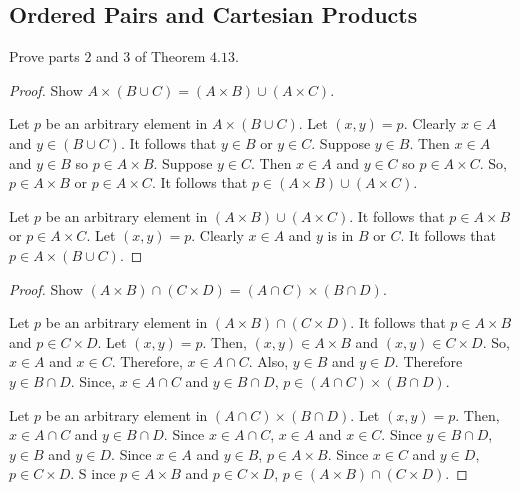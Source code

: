 \subsection{Ordered Pairs and Cartesian Products}

\begin{tcolorbox}[title=Problem 5, breakable]
    Prove parts $2$ and $3$ of Theorem $4.13$.
\end{tcolorbox}

\begin{proof}
    Show $A \times (B \cup C) = (A \times B) \cup (A \times C)$.

    Let $p$ be an arbitrary element in $A \times (B \cup C)$. Let $(x, y) = p$.
    Clearly $x \in A$ and $y \in (B \cup C)$. It follows that $y \in B$ or $y \in
        C$. Suppose $y \in B$. Then $x \in A$ and $y \in B$ so $p \in A \times B$.
    Suppose $y \in C$. Then $x \in A$ and $y \in C$ so $p \in A \times C$. So, $p
        \in A \times B$ or $p \in A \times C$. It follows that $p \in (A \times B) \cup
        (A \times C)$.

    Let $p$ be an arbitrary element in $(A \times B) \cup (A \times C)$. It follows
    that $p \in A \times B$ or $p \in A \times C$. Let $(x, y) = p$. Clearly $x \in
        A$ and $y$ is in $B$ or $C$. It follows that $p \in A \times (B \cup C)$.
\end{proof}

\begin{proof}
    Show $(A \times B) \cap (C \times D) = (A \cap C) \times (B \cap D)$.

    Let $p$ be an arbitrary element in $(A \times B) \cap (C \times D)$. It follows
    that $p \in A \times B$ and $p \in C \times D$. Let $(x, y) = p$. Then, $(x, y)
        \in A \times B$ and $(x, y) \in C \times D$. So, $x \in A$ and $x \in C$.
    Therefore, $x \in A \cap C$. Also, $y \in B$ and $y \in D$. Therefore $y \in B
        \cap D$. Since, $x \in A \cap C$ and $y \in B \cap D$, $p \in (A \cap C) \times
        (B \cap D)$.

    Let $p$ be an arbitrary element in $(A \cap C) \times (B \cap D)$. Let $(x, y)
        = p$. Then, $x \in A \cap C$ and $y \in B \cap D$. Since $x \in A \cap C$, $x
        \in A$ and $x \in C$. Since $y \in B \cap D$, $y \in B$ and $y \in D$. Since $x
        \in A$ and $y \in B$, $p \in A \times B$. Since $x \in C$ and $y \in D$, $p \in
        C \times D$. S ince $p \in A \times B$ and $p \in C \times D$, $p \in (A \times
        B) \cap (C \times D)$.
\end{proof}

